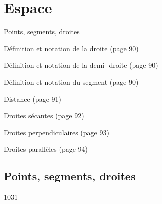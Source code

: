 \documentclass[a4paper,11pt]{report}
\begin{document}
\newcommand{\chapterName}{Espace}
\newcommand{\serieName}{Points, segments, droites}


\chapter*{\chapterName}
\thispagestyle{empty}

\begin{amL}{\serieName}{
\item Définition et notation de la droite (page 90)
\item Définition et notation de la demi- droite (page 90)
\item Définition et notation du segment (page 90)
\item Distance (page 91)
\item Droites sécantes (page 92)
\item Droites perpendiculaires (page 93)
\item Droites parallèles (page 94)
}
\end{amL}

\section*{\serieName}
\setcounter{page}{1}
\thispagestyle{firstPage}



\begin{QSJ}{103}{1}
\end{QSJ}
\end{document}
